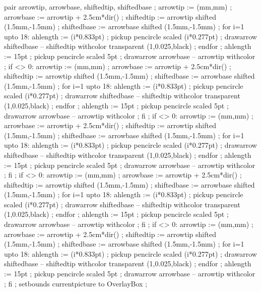 pair arrowtip, arrowbase, shiftedtip, shiftedbase ;
arrowtip := (mm,mm) ;
arrowbase := arrowtip + 2.5cm*dir() ;
shiftedtip := arrowtip shifted (1.5mm,-1.5mm) ;
shiftedbase := arrowbase shifted (1.5mm,-1.5mm) ;
for i=1 upto 18:
	ahlength := (i*0.833pt) ;
	pickup pencircle scaled (i*0.277pt) ;
	drawarrow shiftedbase -- shiftedtip withcolor transparent (1,0.025,black) ;
endfor ;
ahlength := 15pt ;
pickup pencircle scaled 5pt ;
drawarrow arrowbase -- arrowtip withcolor  ;
if  <> 0:
   arrowtip := (mm,mm) ;
   arrowbase := arrowtip + 2.5cm*dir() ;
   shiftedtip := arrowtip shifted (1.5mm,-1.5mm) ;
   shiftedbase := arrowbase shifted (1.5mm,-1.5mm) ;
   for i=1 upto 18:
   	ahlength := (i*0.833pt) ;
   	pickup pencircle scaled (i*0.277pt) ;
   	drawarrow shiftedbase -- shiftedtip withcolor transparent (1,0.025,black) ;
   endfor ;
   ahlength := 15pt ;
   pickup pencircle scaled 5pt ;
   drawarrow arrowbase -- arrowtip withcolor  ;
fi ;
if  <> 0:
   arrowtip := (mm,mm) ;
   arrowbase := arrowtip + 2.5cm*dir() ;
   shiftedtip := arrowtip shifted (1.5mm,-1.5mm) ;
   shiftedbase := arrowbase shifted (1.5mm,-1.5mm) ;
   for i=1 upto 18:
   	ahlength := (i*0.833pt) ;
   	pickup pencircle scaled (i*0.277pt) ;
   	drawarrow shiftedbase -- shiftedtip withcolor transparent (1,0.025,black) ;
   endfor ;
   ahlength := 15pt ;
   pickup pencircle scaled 5pt ;
   drawarrow arrowbase -- arrowtip withcolor  ;
fi ;
if  <> 0:
   arrowtip := (mm,mm) ;
   arrowbase := arrowtip + 2.5cm*dir() ;
   shiftedtip := arrowtip shifted (1.5mm,-1.5mm) ;
   shiftedbase := arrowbase shifted (1.5mm,-1.5mm) ;
   for i=1 upto 18:
   	ahlength := (i*0.833pt) ;
   	pickup pencircle scaled (i*0.277pt) ;
   	drawarrow shiftedbase -- shiftedtip withcolor transparent (1,0.025,black) ;
   endfor ;
   ahlength := 15pt ;
   pickup pencircle scaled 5pt ;
   drawarrow arrowbase -- arrowtip withcolor  ;
fi ;
if  <> 0:
   arrowtip := (mm,mm) ;
   arrowbase := arrowtip + 2.5cm*dir() ;
   shiftedtip := arrowtip shifted (1.5mm,-1.5mm) ;
   shiftedbase := arrowbase shifted (1.5mm,-1.5mm) ;
   for i=1 upto 18:
   	ahlength := (i*0.833pt) ;
   	pickup pencircle scaled (i*0.277pt) ;
   	drawarrow shiftedbase -- shiftedtip withcolor transparent (1,0.025,black) ;
   endfor ;
   ahlength := 15pt ;
   pickup pencircle scaled 5pt ;
   drawarrow arrowbase -- arrowtip withcolor  ;
fi ;
setbounds currentpicture to OverlayBox ;
\stopuseMPgraphic

